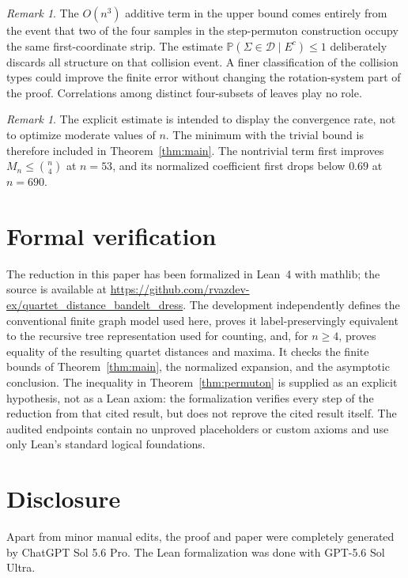 \documentclass[a4paper]{amsart}
\theoremstyle{remark}
\newtheorem{remark}[theorem]{Remark}
\newcommand{\Prb}{\mathbb P}
\newcommand{\Dih}{\mathcal D}
\begin{document}
\begin{remark}\label{rem:error}
The $O(n^3)$ additive term in the upper bound comes entirely from the
event that two of the four samples in the step-permuton construction
occupy the same first-coordinate strip. The estimate
$\Prb(\Sigma\in\Dih\mid E^c)\le1$ deliberately discards all
structure on that collision event. A finer classification of the
collision types could improve the finite error without changing the
rotation-system part of the proof. Correlations among distinct
four-subsets of leaves play no role.
\end{remark}

\begin{remark}\label{rem:finite}
The explicit estimate is intended to display the convergence rate,
not to optimize moderate values of $n$. The minimum with the trivial
bound is therefore included in Theorem~\ref{thm:main}. The nontrivial
term first improves $M_n\le\binom n4$ at $n=53$, and its normalized
coefficient first drops below $0.69$ at $n=690$.
\end{remark}

\section{Formal verification}

The reduction in this paper has been formalized in Lean~4 with
mathlib; the source is available at
\url{https://github.com/rvazdev-ex/quartet_distance_bandelt_dress}.
The development independently defines the conventional finite graph
model used here, proves it label-preservingly equivalent to the
recursive tree representation used for counting, and, for $n\ge4$,
proves equality of the resulting quartet distances and maxima. It
checks the finite bounds of Theorem~\ref{thm:main}, the normalized
expansion, and the asymptotic conclusion. The inequality in
Theorem~\ref{thm:permuton} is supplied as an explicit hypothesis, not
as a Lean axiom: the formalization verifies every step of the reduction
from that cited result, but does not reprove the cited result itself.
The audited endpoints contain no unproved placeholders or custom
axioms and use only Lean's standard logical foundations.

\section{Disclosure}

Apart from minor manual edits, the proof and paper were completely
generated by ChatGPT Sol 5.6 Pro. The Lean formalization was done with
GPT-5.6 Sol Ultra.
\end{document}
